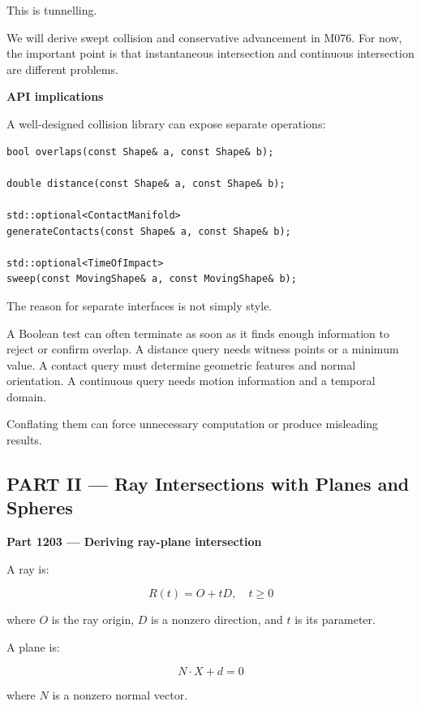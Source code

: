 This is tunnelling.

We will derive swept collision and conservative advancement in M076. For now, the important point is that instantaneous intersection and continuous intersection are different problems.

\textbf{API implications}

A well-designed collision library can expose separate operations:

\begin{verbatim}
bool overlaps(const Shape& a, const Shape& b);

double distance(const Shape& a, const Shape& b);

std::optional<ContactManifold>
generateContacts(const Shape& a, const Shape& b);

std::optional<TimeOfImpact>
sweep(const MovingShape& a, const MovingShape& b);
\end{verbatim}

The reason for separate interfaces is not simply style.

A Boolean test can often terminate as soon as it finds enough information to reject or confirm overlap. A distance query needs witness points or a minimum value. A contact query must determine geometric features and normal orientation. A continuous query needs motion information and a temporal domain.

Conflating them can force unnecessary computation or produce misleading results.

\subsection{PART II --- Ray Intersections with Planes and Spheres}\label{04-visual-computing-ii-ch023-part-ii-ray-intersections-with-planes-and-spheres}

\hypertarget{04-visual-computing-ii-ch023-part-ii-ray-intersections-with-planes-and-spheres}{}

\textbf{Part 1203 --- Deriving ray-plane intersection}

A ray is:

\[
\boxed{R(t)=O+tD,\quad t\ge0}
\]

where \(O\) is the ray origin, \(D\) is a nonzero direction, and \(t\) is its parameter.

A plane is:

\[
\boxed{N\cdot X+d=0}
\]

where \(N\) is a nonzero normal vector.

